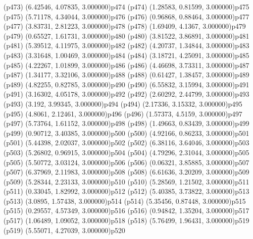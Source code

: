 \psdot(p473)
\psPoint(6.42546, 4.07835, 3.000000){p474}
\psdot(p474)
\psPoint(1.28583, 0.81599, 3.000000){p475}
\psdot(p475)
\psPoint(5.71178, 4.34044, 3.000000){p476}
\psdot(p476)
\psPoint(0.96868, 0.88464, 3.000000){p477}
\psdot(p477)
\psPoint(3.83731, 2.81223, 3.000000){p478}
\psdot(p478)
\psPoint(1.69409, 4.1367, 3.000000){p479}
\psdot(p479)
\psPoint(0.65527, 1.61731, 3.000000){p480}
\psdot(p480)
\psPoint(3.81522, 3.86891, 3.000000){p481}
\psdot(p481)
\psPoint(5.39512, 4.11975, 3.000000){p482}
\psdot(p482)
\psPoint(4.20737, 1.34844, 3.000000){p483}
\psdot(p483)
\psPoint(3.31648, 1.00469, 3.000000){p484}
\psdot(p484)
\psPoint(3.18721, 4.25091, 3.000000){p485}
\psdot(p485)
\psPoint(4.22267, 1.01899, 3.000000){p486}
\psdot(p486)
\psPoint(4.46698, 3.73311, 3.000000){p487}
\psdot(p487)
\psPoint(1.34177, 3.32106, 3.000000){p488}
\psdot(p488)
\psPoint(0.61427, 1.38457, 3.000000){p489}
\psdot(p489)
\psPoint(4.82255, 0.82785, 3.000000){p490}
\psdot(p490)
\psPoint(6.55832, 3.15994, 3.000000){p491}
\psdot(p491)
\psPoint(3.16302, 4.05178, 3.000000){p492}
\psdot(p492)
\psPoint(2.60292, 2.44799, 3.000000){p493}
\psdot(p493)
\psPoint(3.192, 3.99345, 3.000000){p494}
\psdot(p494)
\psPoint(2.17336, 3.15332, 3.000000){p495}
\psdot(p495)
\psPoint(4.8061, 2.12461, 3.000000){p496}
\psdot(p496)
\psPoint(1.57373, 4.5159, 3.000000){p497}
\psdot(p497)
\psPoint(5.73764, 1.61152, 3.000000){p498}
\psdot(p498)
\psPoint(1.49663, 0.83439, 3.000000){p499}
\psdot(p499)
\psPoint(0.90712, 3.40385, 3.000000){p500}
\psdot(p500)
\psPoint(4.92166, 0.86233, 3.000000){p501}
\psdot(p501)
\psPoint(5.44398, 2.02037, 3.000000){p502}
\psdot(p502)
\psPoint(6.38116, 3.64046, 3.000000){p503}
\psdot(p503)
\psPoint(5.26802, 0.96915, 3.000000){p504}
\psdot(p504)
\psPoint(4.79296, 2.31044, 3.000000){p505}
\psdot(p505)
\psPoint(5.50772, 3.03124, 3.000000){p506}
\psdot(p506)
\psPoint(0.06321, 3.85885, 3.000000){p507}
\psdot(p507)
\psPoint(6.37969, 2.11983, 3.000000){p508}
\psdot(p508)
\psPoint(6.61636, 3.20209, 3.000000){p509}
\psdot(p509)
\psPoint(5.28344, 2.23133, 3.000000){p510}
\psdot(p510)
\psPoint(5.28569, 1.21502, 3.000000){p511}
\psdot(p511)
\psPoint(0.33045, 1.82992, 3.000000){p512}
\psdot(p512)
\psPoint(5.40385, 3.73822, 3.000000){p513}
\psdot(p513)
\psPoint(3.0895, 1.57438, 3.000000){p514}
\psdot(p514)
\psPoint(5.35456, 0.87448, 3.000000){p515}
\psdot(p515)
\psPoint(0.29557, 4.57349, 3.000000){p516}
\psdot(p516)
\psPoint(0.94842, 1.35204, 3.000000){p517}
\psdot(p517)
\psPoint(1.06489, 1.09052, 3.000000){p518}
\psdot(p518)
\psPoint(5.76499, 1.96431, 3.000000){p519}
\psdot(p519)
\psPoint(5.55071, 4.27039, 3.000000){p520}
